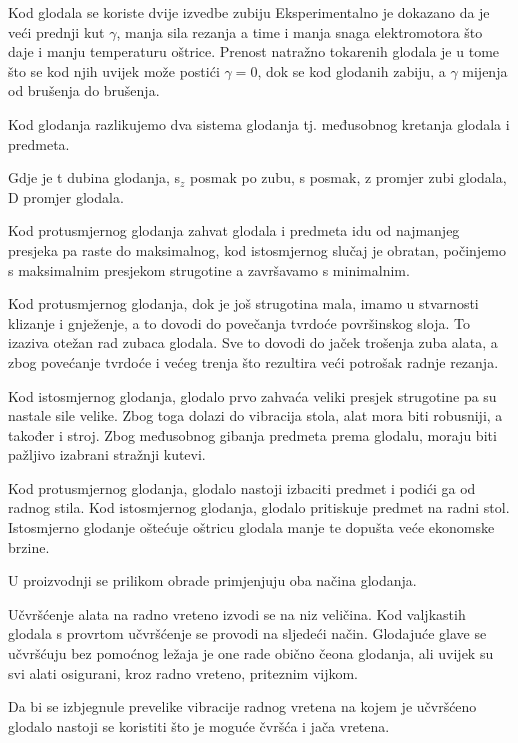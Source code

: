 \documentclass[a4paper,12pt]{article}
\numberwithin{figure}{section}
\begin{document}
Kod glodala se koriste dvije izvedbe zubiju
Eksperimentalno je dokazano da je veći prednji kut $\gamma$, manja sila rezanja a time i manja snaga elektromotora što daje i manju temperaturu oštrice. Prenost natražno tokarenih glodala je u tome što se kod njih uvijek može postići $\gamma = 0$, dok se kod glodanih zabiju, a $\gamma$ mijenja od brušenja do brušenja.\par
Kod glodanja razlikujemo dva sistema glodanja tj. međusobnog kretanja glodala i predmeta.

Gdje je t dubina glodanja, s$_{z}$ posmak po zubu, s posmak, z promjer zubi glodala, D promjer glodala. \par
Kod protusmjernog glodanja zahvat glodala i predmeta idu od najmanjeg presjeka pa raste do maksimalnog, kod istosmjernog slučaj je obratan, počinjemo s maksimalnim presjekom strugotine a završavamo s minimalnim.\par
Kod  protusmjernog glodanja, dok je još strugotina mala, imamo u stvarnosti klizanje i gnježenje, a to dovodi do povečanja tvrdoće površinskog sloja. To izaziva otežan rad zubaca glodala. Sve to dovodi do jaček trošenja zuba alata, a zbog povećanje tvrdoće i većeg trenja što rezultira veći potrošak radnje rezanja.\par
Kod istosmjernog glodanja, glodalo prvo zahvaća veliki presjek strugotine pa su nastale sile velike. Zbog toga
dolazi do vibracija stola, alat mora biti robusniji, a također i stroj. Zbog međusobnog gibanja predmeta prema glodalu, moraju biti pažljivo izabrani stražnji kutevi. \par
Kod protusmjernog glodanja, glodalo nastoji izbaciti predmet i podići ga od radnog stila. Kod istosmjernog glodanja, glodalo pritiskuje predmet na radni stol. Istosmjerno glodanje oštećuje oštricu glodala manje te dopušta veće ekonomske brzine.\par
U proizvodnji se prilikom obrade primjenjuju oba načina glodanja.\par
Učvršćenje alata na radno vreteno izvodi se na niz veličina. Kod valjkastih glodala s provrtom učvršćenje se provodi na sljedeći način.
Glodajuće glave se učvršćuju bez pomoćnog ležaja je one rade obično čeona glodanja, ali uvijek su svi alati osigurani, kroz radno vreteno, priteznim vijkom.\par
Da bi se izbjegnule prevelike vibracije radnog vretena na kojem je učvršćeno glodalo nastoji se koristiti što je moguće čvršća i jača vretena.
\end{document}
